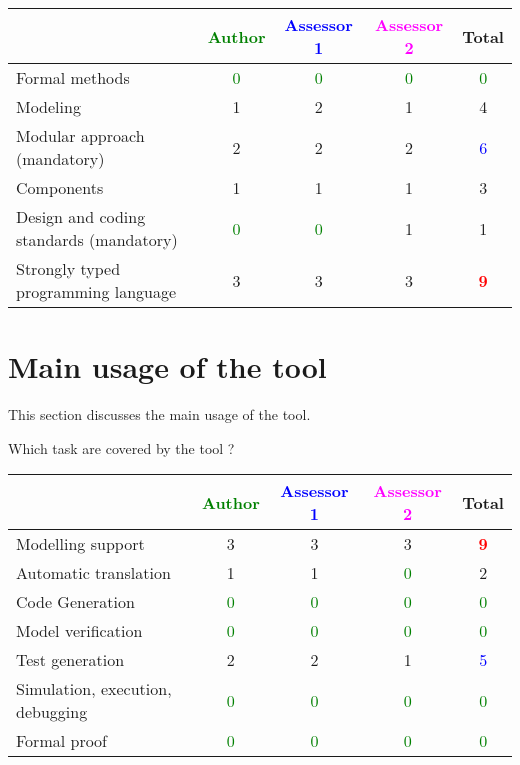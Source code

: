 \begin{tabular}{|l | c | c | c | c|}
\hline
& \textcolor{green}{Author} & \textcolor{blue}{Assessor 1} & \textcolor{magenta}{Assessor 2} & Total \\
\hline
Formal methods & \textcolor{green}{0} & \textcolor{green}{0} & \textcolor{green}{0} & \textcolor{green}{0} \\
\hline
Modeling & 1     & 2     & 1     & 4     \\
\hline
Modular approach (mandatory) & 2     & 2     & 2     & \textcolor{blue}{6} \\
\hline
Components & 1     & 1     & 1     & 3     \\
\hline
Design and coding standards (mandatory) & \textcolor{green}{0} & \textcolor{green}{0} & 1     & 1     \\
\hline
Strongly typed programming language & 3     & 3     & 3     & \textcolor{red}{\textbf{9}} \\
\hline
\end{tabular}

\section{Main usage of the tool}
\label{main_usage}

This section discusses the main usage of the tool.

Which task are covered by the tool ?


\begin{tabular}{|l | c | c | c | c|}
\hline
& \textcolor{green}{Author} & \textcolor{blue}{Assessor 1} & \textcolor{magenta}{Assessor 2} & Total \\
\hline
Modelling support & 3     & 3     & 3     & \textcolor{red}{\textbf{9}} \\
\hline
Automatic translation & 1     & 1     & \textcolor{green}{0} & 2     \\
\hline
Code Generation & \textcolor{green}{0} & \textcolor{green}{0} & \textcolor{green}{0} & \textcolor{green}{0} \\
\hline
Model verification & \textcolor{green}{0} & \textcolor{green}{0} & \textcolor{green}{0} & \textcolor{green}{0} \\
\hline
Test generation & 2     & 2     & 1     & \textcolor{blue}{5} \\
\hline
Simulation, execution, debugging & \textcolor{green}{0} & \textcolor{green}{0} & \textcolor{green}{0} & \textcolor{green}{0} \\
\hline
Formal proof & \textcolor{green}{0} & \textcolor{green}{0} & \textcolor{green}{0} & \textcolor{green}{0} \\
\hline
\end{tabular}

